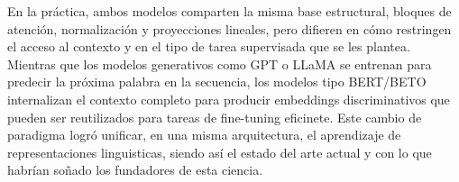 En la práctica, ambos modelos comparten la misma base estructural, bloques de atención, normalización
y proyecciones lineales, pero difieren en cómo restringen el acceso al contexto y en el tipo de 
tarea supervisada que se les plantea. Mientras que los modelos generativos como GPT o LLaMA se entrenan 
para predecir la próxima palabra en la secuencia, los modelos tipo BERT/BETO internalizan el contexto 
completo para producir embeddings discriminativos que pueden ser reutilizados para tareas de fine-tuning 
eficinete. Este cambio de paradigma logró unificar, en una misma arquitectura, el aprendizaje de representaciones 
linguisticas, siendo así el estado del arte actual y con lo que habrían soñado los fundadores de esta
ciencia. 

